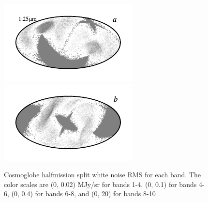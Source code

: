 \documentclass{aa}
\begin{document}
\begin{figure}
	\includegraphics{figs/rms_maps/rms_01a_c0001_000022.pdf}\includegraphics{figs/rms_maps/rms_01b_c0001_000022.pdf}
  \vspace*{-0.85cm}

	\caption{Cosmoglobe halfmission split white noise RMS for each band. The color scales are (0, 0.02) MJy/sr for bands 1-4, (0, 0.1) for bands 4-6, (0, 0.4) for bands 6-8, and (0, 20) for bands 8-10}
	\label{fig:rms}
\end{figure}
\end{document}

